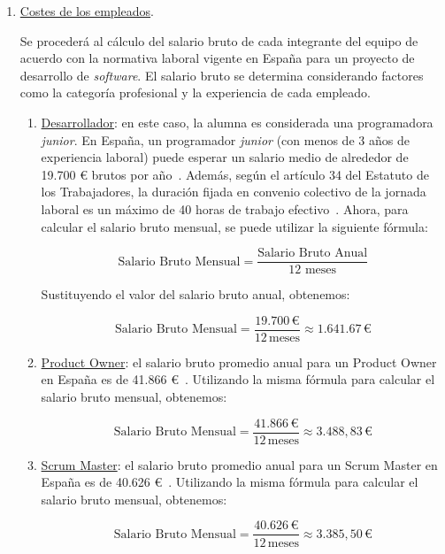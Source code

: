 \begin{enumerate}
    \item \underline{Costes de los empleados}.
    
    Se procederá al cálculo del salario bruto de cada integrante del equipo de acuerdo con la normativa laboral vigente en España para un proyecto de desarrollo de \textit{software}. El salario bruto se determina considerando factores como la categoría profesional y la experiencia de cada empleado.

    \begin{enumerate}
        \item \underline{Desarrollador}: en este caso, la alumna es considerada una programadora \textit{junior}. En España, un programador \textit{junior} (con menos de 3 años de experiencia laboral) puede esperar un salario medio de alrededor de 19.700 € brutos por año~\cite{Jobted}. Además, según el artículo 34 del Estatuto de los Trabajadores, la duración fijada en convenio colectivo de la jornada laboral es un máximo de 40 horas de trabajo efectivo~\cite{jornadalaboral}. Ahora, para calcular el salario bruto mensual, se puede utilizar la siguiente fórmula:

        \[
        \text{{Salario Bruto Mensual}} = \frac{{\text{{Salario Bruto Anual}}}}{{12 \text{{ meses}}}}
        \]
        
        Sustituyendo el valor del salario bruto anual, obtenemos:
        
        \[
        \text{{Salario Bruto Mensual}} = \frac{{19.700 \, \text{{€}}}}{{12 \, \text{{meses}}}} \approx 1.641.67 \, \text{{€}}
        \]

        \item \underline{Product Owner}: el salario bruto promedio anual para un Product Owner en España es de 41.866 €~\cite{PayScale2}. Utilizando la misma fórmula para calcular el salario bruto mensual, obtenemos:

        \[\text{{Salario Bruto Mensual}} = \frac{{41.866 \, \text{{€}}}}{{12 \, \text{{meses}}}} \approx 3.488,83 \, \text{{€}}\]
        
        \item \underline{Scrum Master}: el salario bruto promedio anual para un Scrum Master en España es de 40.626 €~\cite{PayScale1}. Utilizando la misma fórmula para calcular el salario bruto mensual, obtenemos:
        
        \[\text{{Salario Bruto Mensual}} = \frac{{40.626 \, \text{{€}}}}{{12 \, \text{{meses}}}} \approx 3.385,50 \, \text{{€}}\]
        

\end{enumerate}
\end{enumerate}
